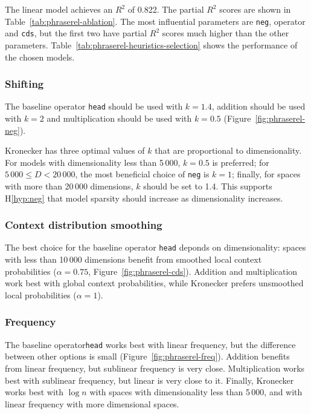 

The linear model achieves an $R^2$ of 0.822. The partial $R^2$ scores are shown in Table~\ref{tab:phraserel-ablation}. The most influential parameters are \texttt{neg}, operator and \texttt{cds}, but the first two have partial $R^2$ scores much higher than the other parameters. Table~\ref{tab:phraserel-heuristics-selection} shows the performance of the chosen models.

\subsubsection{Shifting}
\label{sec:shifting-phraserel}

The baseline operator \texttt{head} should be used with $k = 1.4$, addition should be used with $k = 2$ and multiplication should be used with $k = 0.5$ (Figure~\ref{fig:phraserel-neg}).

Kronecker has three optimal values of $k$ that are proportional to dimensionality. For models with dimensionality less than 5\,000, $k = 0.5$ is preferred; for $5\,000 \leq D < 20\,000$, the most beneficial choice of \texttt{neg} is $k = 1$; finally, for spaces with more than 20\,000 dimensions, $k$ should be set to 1.4. This supports H\ref{hyp:neg} that model sparsity should increase as dimensionality increases.



\subsubsection{Context distribution smoothing}
\label{sec:cont-distr-smooth-phraserel}

The best choice for the baseline operator \texttt{head} deponds on dimensionality: spaces with less than 10\,000 dimensions benefit from smoothed local context probabilities ($\alpha = 0.75$, Figure~\ref{fig:phraserel-cds}). Addition and multiplication work best with global context probabilities, while Kronecker prefers unsmoothed local probabilities ($\alpha = 1$).

\subsubsection{Frequency}
\label{sec:frequency-phraserel}

The baseline operator\texttt{head} works best with linear frequency, but the difference between other options is small (Figure~\ref{fig:phraserel-freq}). Addition benefits from linear frequency, but sublinear frequency is very close. Multiplication works best with sublinear frequency, but linear is very close to it. Finally, Kronecker works best with $\log n$ with spaces with dimensionality less than 5\,000, and with linear frequency with more dimensional spaces.


